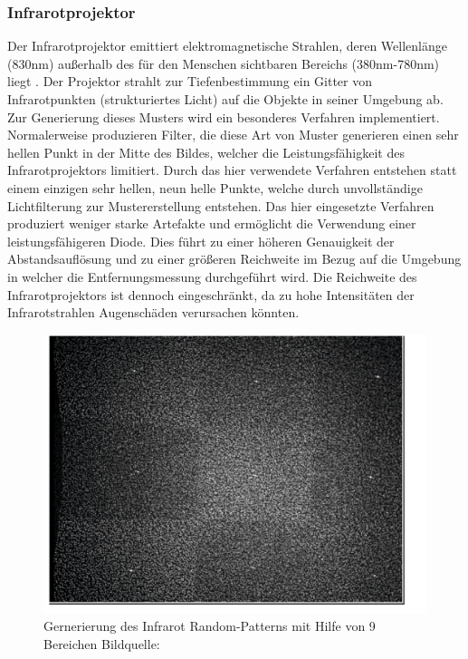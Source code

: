 \subsubsection{Infrarotprojektor}
Der Infrarotprojektor emittiert elektromagnetische Strahlen, deren Wellenlänge (830nm) außerhalb des für den Menschen sichtbaren Bereichs (380nm-780nm) liegt .
Der Projektor strahlt zur Tiefenbestimmung ein Gitter von Infrarotpunkten (strukturiertes Licht) auf die Objekte in seiner Umgebung ab. 
Zur Generierung dieses Musters wird ein besonderes Verfahren implementiert.
Normalerweise produzieren Filter, die diese Art von Muster generieren einen sehr hellen Punkt in der Mitte des Bildes, welcher die Leistungsfähigkeit des Infrarotprojektors limitiert. Durch das hier verwendete Verfahren entstehen statt einem einzigen sehr hellen, neun helle Punkte, welche durch unvollständige Lichtfilterung zur Mustererstellung entstehen. Das hier eingesetzte Verfahren produziert weniger starke Artefakte und ermöglicht die Verwendung einer leistungsfähigeren Diode. Dies führt zu einer höheren Genauigkeit der Abstandsauflösung und zu einer größeren Reichweite im Bezug auf die Umgebung in welcher die Entfernungsmessung durchgeführt wird. Die Reichweite des Infrarotprojektors ist dennoch eingeschränkt, da zu hohe Intensitäten der Infrarotstrahlen Augenschäden verursachen könnten.
\begin{figure}
\centering
\includegraphics[width=0.5\linewidth]{./Res/9_Dots}
\caption{Gernerierung des Infrarot Random-Patterns mit Hilfe von 9 Bereichen Bildquelle:\cite{Kramer}}
\label{fig:9_Dots}
\end{figure}
\FloatBarrier

